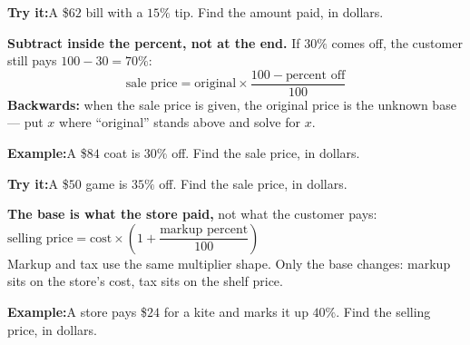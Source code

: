 \documentclass[12pt]{article}
\begin{document}
\begin{tryitbox}
\textbf{Try it:}\quad A \$$62$ bill with a $15\%$ tip. Find the amount paid, in
dollars.\\[2pt]
\end{tryitbox}


\begin{formulabox}
\textbf{Subtract inside the percent, not at the end.} If $30\%$ comes off, the
customer still pays $100 - 30 = 70\%$:
\[ \text{sale price} = \text{original} \times \frac{100 - \text{percent off}}{100} \]
\textbf{Backwards:} when the sale price is given, the original price is the
unknown base --- put $x$ where ``original'' stands above and solve for $x$.
\end{formulabox}

\begin{examplebox}
\textbf{Example:}\quad A \$$84$ coat is $30\%$ off. Find the sale price, in
dollars.
\end{examplebox}

\begin{tryitbox}
\textbf{Try it:}\quad A \$$50$ game is $35\%$ off. Find the sale price, in
dollars.\\[2pt]
\end{tryitbox}


\begin{formulabox}
\textbf{The base is what the store paid,} not what the customer pays:\\[3pt]
$\text{selling price} = \text{cost} \times \left(1 + \dfrac{\text{markup percent}}{100}\right)$\\[3pt]
Markup and tax use the same multiplier shape. Only the base changes: markup sits
on the store's cost, tax sits on the shelf price.
\end{formulabox}

\begin{examplebox}
\textbf{Example:}\quad A store pays \$$24$ for a kite and marks it up $40\%$.
Find the selling price, in dollars.
\end{examplebox}
\end{document}

